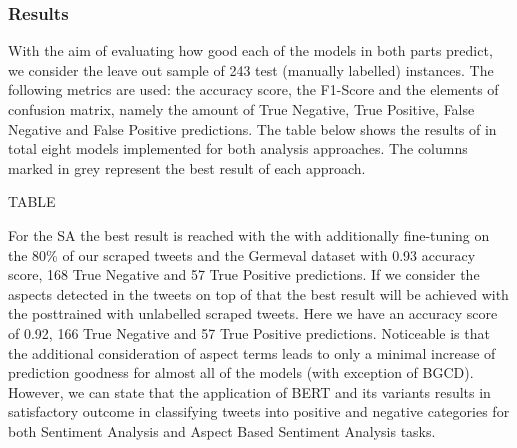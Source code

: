 
\subsubsection{Results}
\label{tssa_dl_results}

With the aim of evaluating how good each of the models in both parts predict, 
we consider the leave out sample of 243 test (manually labelled) instances.
The following metrics are used: the accuracy score, the F1-Score and the 
elements of confusion matrix, namely the amount of True Negative, True Positive, 
False Negative and False Positive predictions. 
The table below shows the results of in total eight models implemented for both 
analysis approaches.  The columns marked in grey represent the best result of 
each approach. 

TABLE
 
For the SA the best result is reached with the 
with additionally fine-tuning on the 80\% of our scraped tweets and the Germeval 
dataset with 0.93 accuracy score, 168 True Negative and 57 True Positive 
predictions.
If we consider the aspects detected in the tweets on top of that the best result 
will be achieved with the 
posttrained with unlabelled 
scraped tweets. Here we have an accuracy score of 0.92, 166 True Negative and 57 
True Positive predictions. 
Noticeable is that the additional consideration of aspect terms leads to only a 
minimal increase of prediction goodness for almost all of the models (with 
exception of BGCD). 
However, we can state that the application of BERT and its variants results in 
satisfactory outcome in classifying tweets into positive and negative categories 
for both Sentiment Analysis and Aspect Based Sentiment Analysis tasks. 

\color{black}
